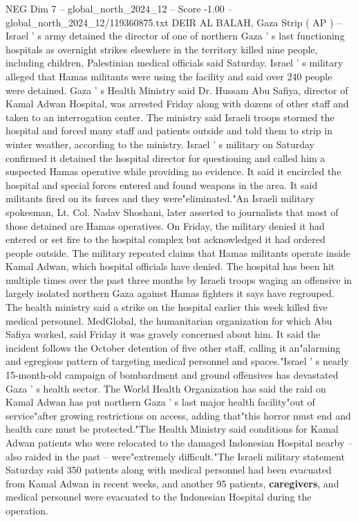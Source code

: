 \begin{textsample}{NEG Dim 7 – global\_north\_2024\_12 – Score -1.00 – global\_north\_2024\_12/119360875.txt}  \label{ex:f7_neg_160}
DEIR AL BALAH, Gaza Strip ( AP ) -- Israel ' s army detained the director of one of northern Gaza ' s last functioning hospitals as overnight strikes elsewhere in the territory killed nine people, including children, Palestinian medical officials said Saturday.
Israel ' s military alleged that Hamas militants were using the facility and said over 240 people were detained.
Gaza ' s Health Ministry said Dr.
Hussam Abu Safiya, director of Kamal Adwan Hospital, was arrested Friday along with dozens of other staff and taken to an interrogation center.
The ministry said Israeli troops stormed the hospital and forced many staff and patients outside and told them to strip in winter weather, according to the ministry.
Israel ' s military on Saturday confirmed it detained the hospital director for questioning and called him a suspected Hamas operative while providing no evidence.
It said it encircled the hospital and special forces entered and found weapons in the area.
It said militants fired on its forces and they were"eliminated."An Israeli military spokesman, Lt.
Col.
Nadav Shoshani, later asserted to journalists that most of those detained are Hamas operatives.
On Friday, the military denied it had entered or set fire to the hospital complex but acknowledged it had ordered people outside.
The military repeated claims that Hamas militants operate inside Kamal Adwan, which hospital officials have denied.
The hospital has been hit multiple times over the past three months by Israeli troops waging an offensive in largely isolated northern Gaza against Hamas fighters it says have regrouped.
The health ministry said a strike on the hospital earlier this week killed five medical personnel.
MedGlobal, the humanitarian organization for which Abu Safiya worked, said Friday it was gravely concerned about him.
It said the incident follows the October detention of five other staff, calling it an"alarming and egregious pattern of targeting medical personnel and spaces."Israel ' s nearly 15-month-old campaign of bombardment and ground offensives has devastated Gaza ' s health sector.
The World Health Organization has said the raid on Kamal Adwan has put northern Gaza ' s last major health facility"out of service"after growing restrictions on access, adding that"this horror must end and health care must be protected."The Health Ministry said conditions for Kamal Adwan patients who were relocated to the damaged Indonesian Hospital nearby -- also raided in the past -- were"extremely difficult."The Israeli military statement Saturday said 350 patients along with medical personnel had been evacuated from Kamal Adwan in recent weeks, and another 95 patients, \textbf{caregivers}, and medical personnel were evacuated to the Indonesian Hospital during the operation.

\end{textsample}
